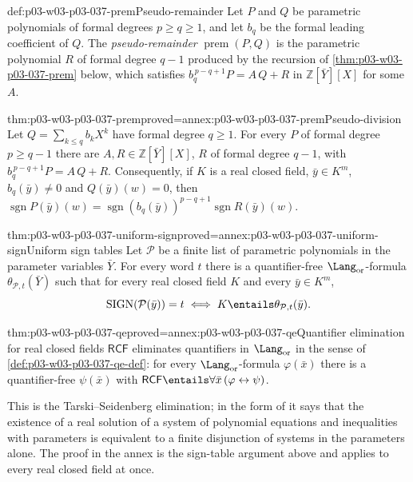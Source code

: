 \begin{hbdefinition}{def:p03-w03-p03-037-prem}{Pseudo-remainder}
Let \(P\) and \(Q\) be parametric polynomials of formal degrees \(p\geq q\geq1\),
and let \(b_q\) be the formal leading coefficient of \(Q\).  The
\emph{pseudo-remainder} \(\operatorname{prem}(P,Q)\) is the parametric
polynomial \(R\) of formal degree \(q-1\) produced by the recursion of
\cref{thm:p03-w03-p03-037-prem} below, which satisfies
\(b_q^{\,p-q+1}P=A\,Q+R\) in \(\mathbb Z[\bar Y][X]\) for some \(A\).
\end{hbdefinition}

\begin{hblemma}{thm:p03-w03-p03-037-prem}{proved=annex:p03-w03-p03-037-prem}{Pseudo-division}
Let \(Q=\sum_{k\leq q}b_kX^k\) have formal degree \(q\geq1\).  For every
\(P\) of formal degree \(p\geq q-1\) there are \(A,R\in\mathbb Z[\bar Y][X]\),
\(R\) of formal degree \(q-1\), with \(b_q^{\,p-q+1}P=A\,Q+R\).  Consequently,
if \(K\) is a real closed field, \(\bar y\in K^m\), \(b_q(\bar y)\neq0\) and
\(Q(\bar y)(w)=0\), then
\(\operatorname{sgn}P(\bar y)(w)=
\operatorname{sgn}(b_q(\bar y))^{p-q+1}\operatorname{sgn}R(\bar y)(w)\).
\end{hblemma}

\begin{hbtheorem}{thm:p03-w03-p03-037-uniform-sign}{proved=annex:p03-w03-p03-037-uniform-sign}{Uniform sign tables}
Let \(\mathcal P\) be a finite list of parametric polynomials in the
parameter variables \(\bar Y\).  For every word \(t\) there is a
quantifier-free \(\Lang_{\mathrm{or}}\)-formula \(\theta_{\mathcal P,t}(\bar Y)\)
such that for every real closed field \(K\) and every \(\bar y\in K^m\),
\[
\operatorname{SIGN}(\mathcal P(\bar y))=t
\iff K\entails\theta_{\mathcal P,t}(\bar y).
\]
\end{hbtheorem}

\begin{hbtheorem}{thm:p03-w03-p03-037-qe}{proved=annex:p03-w03-p03-037-qe}{Quantifier elimination for real closed fields}
\(\mathsf{RCF}\) eliminates quantifiers in \(\Lang_{\mathrm{or}}\) in the
sense of \cref{def:p03-w03-p03-037-qe-def}: for every
\(\Lang_{\mathrm{or}}\)-formula \(\varphi(\bar x)\) there is a quantifier-free
\(\psi(\bar x)\) with
\(\mathsf{RCF}\entails\forall\bar x\,(\varphi\leftrightarrow\psi)\).
\end{hbtheorem}

This is the Tarski--Seidenberg elimination; in the form of
\cite[p.~11, Theorem~1.9]{Coste2002SAG} it says that the existence of a
real solution of a system of polynomial equations and inequalities with
parameters is equivalent to a finite disjunction of systems in the
parameters alone.  The proof in the annex is the sign-table argument above
and applies to every real closed field at once.

